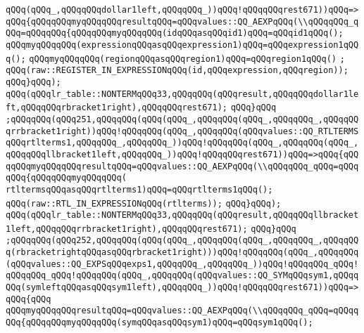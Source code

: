 \verb|qQQq(qQQq_,qQQqqQQqdollar1left,qQQqqQQq_))qQQq!qQQqqQQqrest671))qQQq=>qQQq{qQQqqQQqmyqQQqqQQqresultqQQq=qQQqvalues::QQ_AEXPqQQq(\\qQQqqQQq_qQQq=qQQqqQQq{qQQqqQQqmyqQQqqQQq(idqQQqasqQQqid1)qQQq=qQQqid1qQQq();|\newline
\verb|qQQqmyqQQqqQQq(expressionqQQqasqQQqexpression1)qQQq=qQQqexpression1qQQq();|\newline
\verb|qQQqmyqQQqqQQq(regionqQQqasqQQqregion1)qQQq=qQQqregion1qQQq()|\newline
\verb|;|\newline
\verb|qQQq(raw::REGISTER_IN_EXPRESSIONqQQq(id,qQQqexpression,qQQqregion));|\newline
\verb|qQQq}qQQq);|\newline
\verb|qQQq(qQQqlr_table::NONTERMqQQq33,qQQqqQQq(qQQqresult,qQQqqQQqdollar1left,qQQqqQQqrbracket1right),qQQqqQQqrest671);|\newline
\verb|qQQq}qQQq|\newline
\verb|;qQQqqQQq(qQQq251,qQQqqQQq(qQQq(qQQq_,qQQqqQQq(qQQq_,qQQqqQQq_,qQQqqQQqrrbracket1right))qQQq!qQQqqQQq(qQQq_,qQQqqQQq(qQQqvalues::QQ_RTLTERMSqQQqrtlterms1,qQQqqQQq_,qQQqqQQq_))qQQq!qQQqqQQq(qQQq_,qQQqqQQq(qQQq_,qQQqqQQqllbracket1left,qQQqqQQq_))qQQq!qQQqqQQqrest671))qQQq=>qQQq{qQQqqQQqmyqQQqqQQqresultqQQq=qQQqvalues::QQ_AEXPqQQq(\\qQQqqQQq_qQQq=qQQqqQQq{qQQqqQQqmyqQQqqQQq(|\newline
\verb|rtltermsqQQqasqQQqrtlterms1)qQQq=qQQqrtlterms1qQQq();|\newline
\verb|qQQq(raw::RTL_IN_EXPRESSIONqQQq(rtlterms));|\newline
\verb|qQQq}qQQq);|\newline
\verb|qQQq(qQQqlr_table::NONTERMqQQq33,qQQqqQQq(qQQqresult,qQQqqQQqllbracket1left,qQQqqQQqrrbracket1right),qQQqqQQqrest671);|\newline
\verb|qQQq}qQQq|\newline
\verb|;qQQqqQQq(qQQq252,qQQqqQQq(qQQq(qQQq_,qQQqqQQq(qQQq_,qQQqqQQq_,qQQqqQQq(rbracketrightqQQqasqQQqrbracket1right)))qQQq!qQQqqQQq(qQQq_,qQQqqQQq(qQQqvalues::QQ_EXPSqQQqexps1,qQQqqQQq_,qQQqqQQq_))qQQq!qQQqqQQq_qQQq!qQQqqQQq_qQQq!qQQqqQQq(qQQq_,qQQqqQQq(qQQqvalues::QQ_SYMqQQqsym1,qQQqqQQq(symleftqQQqasqQQqsym1left),qQQqqQQq_))qQQq!qQQqqQQqrest671))qQQq=>qQQq{qQQq|\newline
\verb|qQQqmyqQQqqQQqresultqQQq=qQQqvalues::QQ_AEXPqQQq(\\qQQqqQQq_qQQq=qQQqqQQq{qQQqqQQqmyqQQqqQQq(symqQQqasqQQqsym1)qQQq=qQQqsym1qQQq();|\newline
